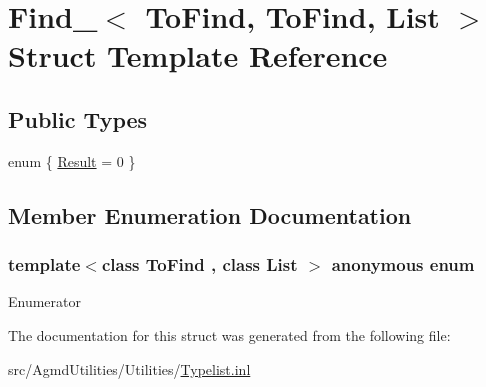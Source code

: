 \hypertarget{struct_find___3_01_to_find_00_01_to_find_00_01_list_01_4}{\section{Find\+\_\+$<$ To\+Find, To\+Find, List $>$ Struct Template Reference}
\label{struct_find___3_01_to_find_00_01_to_find_00_01_list_01_4}
}
\subsection*{Public Types}
\begin{DoxyCompactItemize}
\item 
enum \{ \hyperlink{struct_find___3_01_to_find_00_01_to_find_00_01_list_01_4_a294a2b7df866198efb04d65b218df4aeaab8a111c3e82000e22a8dab77367005d}{Result} = 0
 \}
\end{DoxyCompactItemize}


\subsection{Member Enumeration Documentation}
\hypertarget{struct_find___3_01_to_find_00_01_to_find_00_01_list_01_4_a294a2b7df866198efb04d65b218df4ae}{\subsubsection[{anonymous enum}]{\setlength{\rightskip}{0pt plus 5cm}template$<$class To\+Find , class List $>$ anonymous enum}}\label{struct_find___3_01_to_find_00_01_to_find_00_01_list_01_4_a294a2b7df866198efb04d65b218df4ae}
\begin{Desc}
\item[Enumerator]\par
\begin{description}
\item[{\em 
\hypertarget{struct_find___3_01_to_find_00_01_to_find_00_01_list_01_4_a294a2b7df866198efb04d65b218df4aeaab8a111c3e82000e22a8dab77367005d}{Result}\label{struct_find___3_01_to_find_00_01_to_find_00_01_list_01_4_a294a2b7df866198efb04d65b218df4aeaab8a111c3e82000e22a8dab77367005d}
}]\end{description}
\end{Desc}


The documentation for this struct was generated from the following file\+:\begin{DoxyCompactItemize}
\item 
src/\+Agmd\+Utilities/\+Utilities/\hyperlink{_typelist_8inl}{Typelist.\+inl}\end{DoxyCompactItemize}
